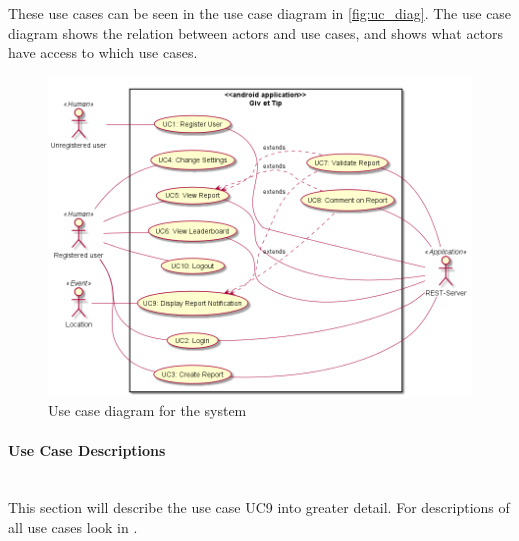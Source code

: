 These use cases can be seen in the use case diagram in \autoref{fig:uc_diag}. The use case diagram shows the relation between actors and use cases, and shows what actors have access to which use cases.

\begin{figure}[hbt]
\centering
\includegraphics[width=\textwidth]{images/use_case_diagram}
\caption{Use case diagram for the system} \label{fig:uc_diag}
\end{figure}

\paragraph{Use Case Descriptions}~\\
\noindent This section will describe the use case UC9 into greater detail. For descriptions of all use cases look in .

